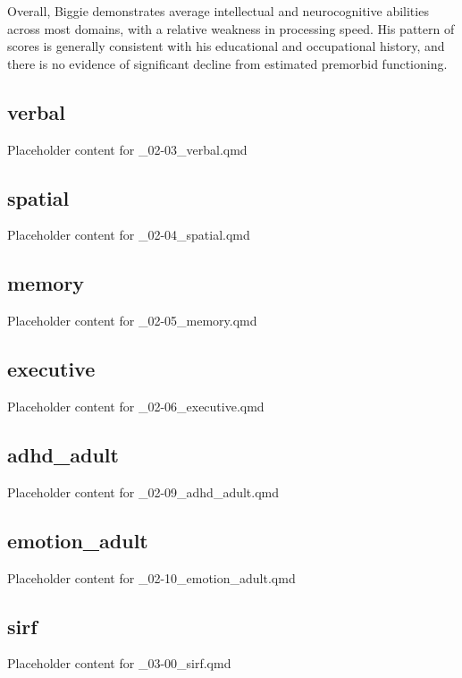 \documentclass[
  letterpaper,
  DIV=11,
  numbers=noendperiod]{scrartcl}
\begin{document}
Overall, Biggie demonstrates average intellectual and neurocognitive
abilities across most domains, with a relative weakness in processing
speed. His pattern of scores is generally consistent with his
educational and occupational history, and there is no evidence of
significant decline from estimated premorbid functioning.

\subsection{verbal}\label{verbal}

Placeholder content for \_02-03\_verbal.qmd

\subsection{spatial}\label{spatial}

Placeholder content for \_02-04\_spatial.qmd

\subsection{memory}\label{memory}

Placeholder content for \_02-05\_memory.qmd

\subsection{executive}\label{executive}

Placeholder content for \_02-06\_executive.qmd

\subsection{adhd\_adult}\label{adhd_adult}

Placeholder content for \_02-09\_adhd\_adult.qmd

\subsection{emotion\_adult}\label{emotion_adult}

Placeholder content for \_02-10\_emotion\_adult.qmd

\subsection{sirf}\label{sirf}

Placeholder content for \_03-00\_sirf.qmd
\end{document}
